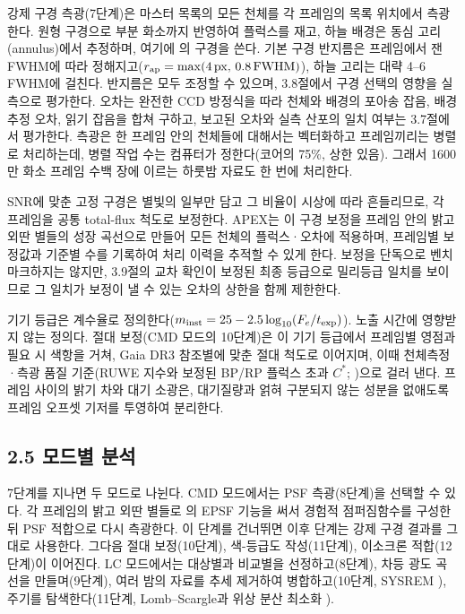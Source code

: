 강제 구경 측광(7단계)은 마스터 목록의 모든 천체를 각 프레임의 목록 위치에서 측광한다. 원형 구경으로 부분 화소까지 반영하여 플럭스를 재고, 하늘 배경은 동심 고리(annulus)에서 추정하며, 여기에 \texttt{} \citep{photutils} 의 구경을 쓴다. 기본 구경 반지름은 프레임에서 잰 FWHM에 따라 정해지고($r_{\rm ap} = \max(4\,{\rm px},\, 0.8\,{\rm FWHM})$), 하늘 고리는 대략 4–6 FWHM에 걸친다. 반지름은 모두 조정할 수 있으며, 3.8절에서 구경 선택의 영향을 실측으로 평가한다. 오차는 완전한 CCD 방정식을 따라 천체와 배경의 포아송 잡음, 배경 추정 오차, 읽기 잡음을 합쳐 구하고, 보고된 오차와 실측 산포의 일치 여부는 3.7절에서 평가한다. 측광은 한 프레임 안의 천체들에 대해서는 벡터화하고 프레임끼리는 병렬로 처리하는데, 병렬 작업 수는 컴퓨터가 정한다(코어의 75\%, 상한 있음). 그래서 1600만 화소 프레임 수백 장에 이르는 하룻밤 자료도 한 번에 처리한다.



SNR에 맞춘 고정 구경은 별빛의 일부만 담고 그 비율이 시상에 따라 흔들리므로, 각 프레임을 공통 total-flux 척도로 보정한다. APEX는 이 구경 보정을 프레임 안의 밝고 외딴 별들의 성장 곡선으로 만들어 모든 천체의 플럭스·오차에 적용하며, 프레임별 보정값과 기준별 수를 기록하여 처리 이력을 추적할 수 있게 한다. 보정을 단독으로 벤치마크하지는 않지만, 3.9절의 교차 확인이 보정된 최종 등급으로 밀리등급 일치를 보이므로 그 일치가 보정이 낼 수 있는 오차의 상한을 함께 제한한다.



기기 등급은 계수율로 정의한다($m_{\rm inst} = 25 - 2.5\log_{10}(F_e / t_{\rm exp})$). 노출 시간에 영향받지 않는 정의다. 절대 보정(CMD 모드의 10단계)은 이 기기 등급에서 프레임별 영점과 필요 시 색항을 거쳐, Gaia DR3 \citep{gaia_dr3_2023} 참조별에 맞춘 절대 척도로 이어지며, 이때 천체측정·측광 품질 기준(RUWE 지수와 보정된 BP/RP 플럭스 초과 $C^*$; \citealt{riello2021})으로 걸러 낸다. 프레임 사이의 밝기 차와 대기 소광은, 대기질량과 얽혀 구분되지 않는 성분을 없애도록 프레임 오프셋 기저를 투영하여 분리한다.



\subsection{2.5 모드별 분석}

7단계를 지나면 두 모드로 나뉜다. CMD 모드에서는 PSF 측광(8단계)을 선택할 수 있다. 각 프레임의 밝고 외딴 별들로 \texttt{}의 EPSF 기능을 써서 경험적 점퍼짐함수를 구성한 뒤 PSF 적합으로 다시 측광한다. 이 단계를 건너뛰면 이후 단계는 강제 구경 결과를 그대로 사용한다. 그다음 절대 보정(10단계), 색-등급도 작성(11단계), 이소크론 적합(12단계)이 이어진다. LC 모드에서는 대상별과 비교별을 선정하고(8단계), 차등 광도 곡선을 만들며(9단계), 여러 밤의 자료를 추세 제거하여 병합하고(10단계, SYSREM \citealt{tamuz2005}), 주기를 탐색한다(11단계, Lomb–Scargle과 위상 분산 최소화 \citealt{stellingwerf1978}).



